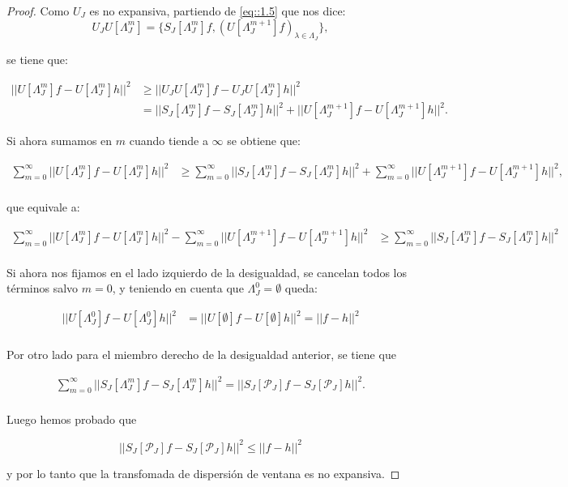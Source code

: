 \begin{proof}
Como $U_J$ es no expansiva, partiendo de \eqref{eq::1.5} que nos dice: 
$$U_J U[\Lambda_J^m]=\lbrace S_J[\Lambda_J^m]f,(U[\Lambda_J^{m+1}]f)_{\lambda\in\Lambda_J}\rbrace,$$

se tiene que:

\begin{align*}
    ||U[\Lambda_J^m]f-U[\Lambda_J^m]h||^2 &\geq ||U_J U[\Lambda_J^m]f-U_J U[\Lambda_J^m]h||^2 \\
    & = ||S_J[\Lambda_J^m]f - S_J[\Lambda_J^m]h||^2 + ||U[\Lambda_J^{m+1}]f-U[\Lambda_J^{m+1}]h||^2.
\end{align*}

\medskip

\noindent Si ahora sumamos en $m$ cuando tiende a $\infty$ se obtiene que: 

\begin{align*}
  \sum_{m=0}^{\infty}||U[\Lambda_J^m]f-U[\Lambda_J^m]h||^2 &\geq \sum_{m=0}^{\infty} ||S_J[\Lambda_J^m]f - S_J[\Lambda_J^m]h||^2 + \sum_{m=0}^{\infty} ||U[\Lambda_J^{m+1}]f-U[\Lambda_J^{m+1}]h||^2,\\
\end{align*}

\noindent que equivale a:

\begin{align*}
  \sum_{m=0}^{\infty}||U[\Lambda_J^m]f-U[\Lambda_J^m]h||^2 - \sum_{m=0}^{\infty} ||U[\Lambda_J^{m+1}]f-U[\Lambda_J^{m+1}]h||^2 &\geq \sum_{m=0}^{\infty} ||S_J[\Lambda_J^m]f - S_J[\Lambda_J^m]h||^2\\
\end{align*}

\noindent Si ahora nos fijamos en el lado izquierdo de la desigualdad, se cancelan todos los términos salvo $m=0$, y teniendo en cuenta que $\Lambda^0_J=\emptyset$ queda: 

\begin{align*}
  ||U[\Lambda_J^0]f-U[\Lambda_J^0]h||^2 &= ||U[\emptyset]f-U[\emptyset]h||^2 = || f - h ||^2 \\
\end{align*}

\noindent Por otro lado para el miembro derecho de la desigualdad anterior, se tiene que

\begin{align*}
  \sum_{m=0}^{\infty} ||S_J[\Lambda_J^m]f - S_J[\Lambda_J^m]h||^2 = ||S_J[\mathcal{P}_J]f - S_J[\mathcal{P}_J]h||^2. \\
\end{align*}

\noindent Luego hemos probado que 

$$||S_J[\mathcal{P}_J]f - S_J[\mathcal{P}_J]h||^2 \leq || f - h ||^2$$

\noindent y por lo tanto que la transfomada de dispersión de ventana es no expansiva. \qedhere
\end{proof}

